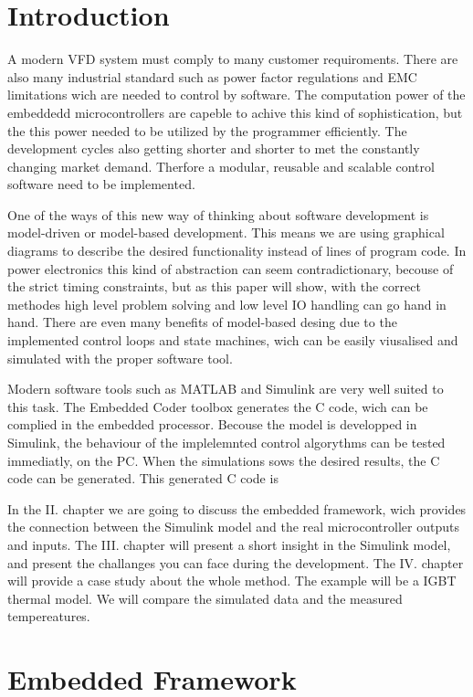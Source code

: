 \section{Introduction}
A modern VFD system must comply to many customer requiroments. There are also many industrial standard such as power factor regulations and EMC limitations wich are needed to control by software. The computation power of the embeddedd microcontrollers are capeble to achive this kind of sophistication, but the this power needed to be utilized by the programmer efficiently. The development cycles also getting shorter and shorter to met the constantly changing market demand. Therfore a modular, reusable and scalable control software need to be implemented.

One of the ways of this new way of thinking about software development is model-driven or model-based development. This means we are using graphical diagrams to describe the desired functionality instead of lines of program code. In power electronics this kind of abstraction can seem contradictionary, becouse  of the strict timing constraints, but as this paper will show, with the correct methodes high level problem solving and low level IO handling can go hand in hand. There are even many benefits of model-based desing due to the implemented control loops and state machines, wich can be easily viusalised and simulated with the proper software tool.

Modern software tools such as MATLAB and Simulink are very well suited to this task. The Embedded Coder toolbox generates the C code, wich can be complied in the embedded processor. Becouse the model is developped in Simulink, the behaviour of the implelemnted control algorythms can be tested immediatly, on the PC. When the simulations sows the desired results, the C code can be generated. This generated C code is 

In the II. chapter we are going to discuss the embedded framework, wich provides the connection between the Simulink model and the real microcontroller outputs and inputs. The III. chapter will present a short insight in the Simulink model, and present the challanges you can face during the development. The IV. chapter will provide a case study about the whole method. The example will be a IGBT thermal model. We will compare the simulated data and the measured tempereatures.


\section{Embedded Framework}

